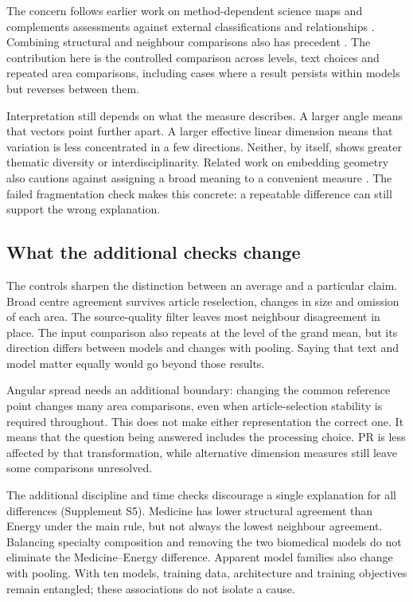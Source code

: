 \documentclass[12pt]{article}
\begin{document}
The concern follows earlier work on method-dependent science maps \citep{refa0d2d707e6,ref6a2f5912bc} and complements assessments against external classifications and relationships \citep{refbe130e2973,refc0e2cc29e0}. Combining structural and neighbour comparisons also has precedent \citep{ref4e1e0d5582}. The contribution here is the controlled comparison across levels, text choices and repeated area comparisons, including cases where a result persists within models but reverses between them.

Interpretation still depends on what the measure describes. A larger angle means that vectors point further apart. A larger effective linear dimension means that variation is less concentrated in a few directions. Neither, by itself, shows greater thematic diversity or interdisciplinarity. Related work on embedding geometry also cautions against assigning a broad meaning to a convenient measure \citep{rudman-etal-2022-isoscore}. The failed fragmentation check makes this concrete: a repeatable difference can still support the wrong explanation.

\subsection{What the additional checks change}
The controls sharpen the distinction between an average and a particular claim. Broad centre agreement survives article reselection, changes in size and omission of each area. The source-quality filter leaves most neighbour disagreement in place. The input comparison also repeats at the level of the grand mean, but its direction differs between models and changes with pooling. Saying that text and model matter equally would go beyond those results.

Angular spread needs an additional boundary: changing the common reference point changes many area comparisons, even when article-selection stability is required throughout. This does not make either representation the correct one. It means that the question being answered includes the processing choice. PR is less affected by that transformation, while alternative dimension measures still leave some comparisons unresolved.

The additional discipline and time checks discourage a single explanation for all differences (Supplement S5). Medicine has lower structural agreement than Energy under the main rule, but not always the lowest neighbour agreement. Balancing specialty composition and removing the two biomedical models do not eliminate the Medicine--Energy difference. Apparent model families also change with pooling. With ten models, training data, architecture and training objectives remain entangled; these associations do not isolate a cause.
\end{document}
